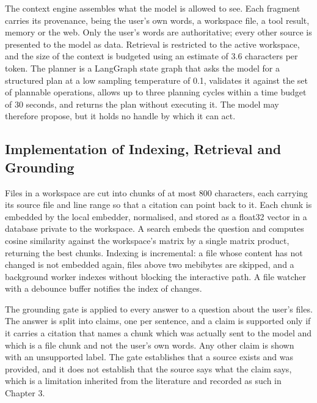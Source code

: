 \documentclass{FastFyp}
\begin{document}
The context engine assembles what the model is allowed to see. Each fragment carries its provenance, being the user's own words, a workspace file, a tool result, memory or the web. Only the user's words are authoritative; every other source is presented to the model as data. Retrieval is restricted to the active workspace, and the size of the context is budgeted using an estimate of 3.6 characters per token. The planner is a LangGraph state graph that asks the model for a structured plan at a low sampling temperature of 0.1, validates it against the set of plannable operations, allows up to three planning cycles within a time budget of 30 seconds, and returns the plan without executing it. The model may therefore propose, but it holds no handle by which it can act.

\subsection{Implementation of Indexing, Retrieval and Grounding}
Files in a workspace are cut into chunks of at most 800 characters, each carrying its source file and line range so that a citation can point back to it. Each chunk is embedded by the local embedder, normalised, and stored as a float32 vector in a database private to the workspace. A search embeds the question and computes cosine similarity against the workspace's matrix by a single matrix product, returning the best chunks. Indexing is incremental: a file whose content has not changed is not embedded again, files above two mebibytes are skipped, and a background worker indexes without blocking the interactive path. A file watcher with a debounce buffer notifies the index of changes.

The grounding gate is applied to every answer to a question about the user's files. The answer is split into claims, one per sentence, and a claim is supported only if it carries a citation that names a chunk which was actually sent to the model and which is a file chunk and not the user's own words. Any other claim is shown with an unsupported label. The gate establishes that a source exists and was provided, and it does not establish that the source says what the claim says, which is a limitation inherited from the literature and recorded as such in Chapter 3.
\end{document}
